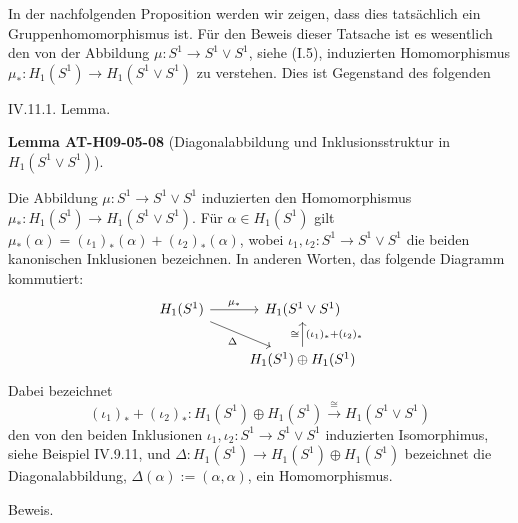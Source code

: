 \documentclass[10pt, letterpaper]{article}
\newcommand{\CustomHeading}[3]{%
  \par\medskip\noindent%
  \textbf{#1 #2} \textnormal{(#3)}.\enskip%
}
\newenvironment{LEM}[2]{\begin{unitbox}\CustomHeading{Lemma}{#1}{#2}}{\end{unitbox}}
\begin{document}
In der nachfolgenden Proposition werden wir zeigen, dass dies tatsächlich ein Gruppenhomomorphismus ist. Für den Beweis dieser Tatsache ist es wesentlich den von der Abbildung $\mu: S^1 \rightarrow S^1 \vee S^1$, siehe (I.5), induzierten Homomorphismus $\mu_*: H_1\left(S^1\right) \rightarrow H_1\left(S^1 \vee S^1\right)$ zu verstehen. Dies ist Gegenstand des folgenden



IV.11.1. Lemma. 

\begin{LEM}{AT-H09-05-08}{Diagonalabbildung und Inklusionsstruktur in $H_1\left(S^1 \vee S^1\right)$}
Die Abbildung $\mu: S^1 \longrightarrow S^1 \vee S^1$ induzierten den Homomorphismus $\mu_*: H_1(S^1) \longrightarrow H_1(S^1 \vee S^1)$. Für $\alpha \in H_1\left(S^1\right)$ gilt $\mu_*(\alpha)=\left(\iota_1\right)_*(\alpha)+\left(\iota_2\right)_*(\alpha)$, wobei $\iota_1, \iota_2: S^1 \rightarrow S^1 \vee S^1$ die beiden kanonischen Inklusionen bezeichnen. In anderen Worten, das folgende Diagramm kommutiert:
\[
\begin{tikzcd}
H_1(S^1) \arrow[r, "\mu_*"] \arrow[dr, "\Delta"'] & H_1(S^1 \vee S^1) \\
& H_1(S^1) \oplus H_1(S^1) \arrow[u, "(\iota_1)_* + (\iota_2)_*"', "\cong"]
\end{tikzcd}
\]
Dabei bezeichnet 
$$\left(\iota_1\right)_*+\left(\iota_2\right)_*: H_1\left(S^1\right) \oplus H_1\left(S^1\right) \stackrel{\cong}{\rightarrow} H_1\left(S^1 \vee S^1\right)$$ 
den von den beiden Inklusionen $\iota_1, \iota_2: S^1 \rightarrow S^1 \vee S^1$ induzierten Isomorphimus, siehe Beispiel IV.9.11, und $\Delta: H_1\left(S^1\right) \rightarrow H_1\left(S^1\right) \oplus H_1\left(S^1\right)$ bezeichnet die Diagonalabbildung, $\Delta(\alpha):=(\alpha, \alpha)$, ein Homomorphismus.
\end{LEM}



Beweis. 
\end{document}
